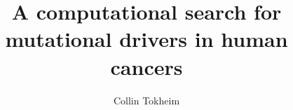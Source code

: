 \documentclass[12pt,oneside,final]{thesis}
\theoremstyle{definition}
\theoremstyle{remark}
\theoremstyle{remark}
\begin{document}
\title{A computational search for mutational drivers in human cancers}
\author{Collin Tokheim}
\dissertation
\doctorphilosophy
\copyrightnotice











\appendix








\end{document}
